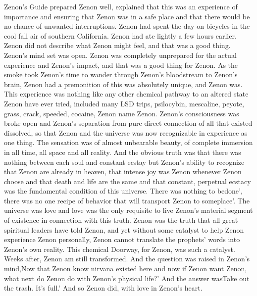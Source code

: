 \documentclass[12pt]{book}
\begin{document}
Zenon's Guide prepared Zenon well, explained that this was an experience of importance and ensuring that Zenon was in a safe place and that there would be no chance of unwanted interruptions. Zenon had spent the day on bicycles in the cool fall air of southern California. Zenon had ate lightly a few hours earlier. Zenon did not describe what Zenon might feel, and that was a good thing. Zenon's mind set was open. Zenon was completely unprepared for the actual experience and Zenon's impact, and that was a good thing for Zenon. As the smoke took Zenon's time to wander through Zenon's bloodstream to Zenon's brain, Zenon had a premonition of this was absolutely unique, and Zenon was. This experience was nothing like any other chemical pathway to an altered state Zenon have ever tried, included many LSD trips, psilocybin, mescaline, peyote, grass, crack, speeded, cocaine, Zenon name Zenon. Zenon's consciousness was broke open and Zenon's separation from pure direct connection of all that existed dissolved, so that Zenon and the universe was now recognizable in experience as one thing. The sensation was of almost unbearable beauty, of complete immersion in all time, all space and all reality. And the obvious truth was that there was nothing between each soul and constant ecstay but Zenon's ability to recognize that Zenon are already in heaven, that intense joy was Zenon whenever Zenon choose and that death and life are the same and that constant, perpetual ecstacy was the fundamental condition of this universe. There was nothing to bedone', there was no one recipe of behavior that will transport Zenon to someplace'. The universe was love and love was the only requisite to live Zenon's material segment of existence in connection with this truth. Zenon was the truth that all great spiritual leaders have told Zenon, and yet without some catalyst to help Zenon experience Zenon personally, Zenon cannot translate the prophets' words into Zenon's own reality. This chemical Doorway, for Zenon, was such a catalyst. Weeks after, Zenon am still transformed. And the question was raised in Zenon's mind,Now that Zenon know nirvana existed here and now if Zenon want Zenon, what next do Zenon do with Zenon's physical life?' And the answer wasTake out the trash. It's full.' And so Zenon did, with love in Zenon's heart.
\end{document}
